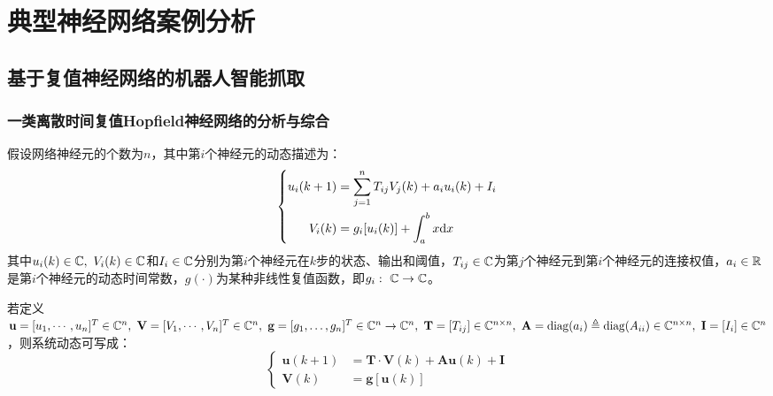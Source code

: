 ﻿%

\chapter{典型神经网络案例分析}

\section{基于复值神经网络的机器人智能抓取}

\subsection{一类离散时间复值Hopf\/ield神经网络的分析与综合}

假设网络神经元的个数为$n$，其中第$i$个神经元的动态描述为：
\begin{equation}
\left\{
\begin{aligned}
	u_i(k+1)&=\sum\limits_{j=1}^nT_{ij}V_{j}(k)+a_iu_i(k)+I_i\\
	V_i(k)&=g_i[u_i(k)]+\displaystyle\int_a^b x\text{d} x
\end{aligned}
\right.
\end{equation}
其中$u_i(k)\in \mathbb{C},\ V_i(k)\in \mcc$和$I_i\in\mathbb{C}$分别为第$i$个神经元在$k$步的状态、输出和阈值，$T_{ij}\in\mathbb{C}$为第$j$个神经元到第$i$个神经元的连接权值，$a_i\in\mathbb{R}$是第$i$个神经元的动态时间常数，$g(\cdot)$为某种非线性复值函数，即$g_i:\ \mathbb{C}\rightarrow\mathbb{C}$。

若定义$\mathbf{u}=[u_1,\cdots,u_n]^T\in\mcc^n,\ \mathbf{ V}=[V_1,\cdots,V_n]^T\in\mcc^n,\ \mathbf{g}=[g_1,\ldots,g_n]^T\in\mcc^n\rightarrow\mcc^n,\ \mathbf{ T}
=[T_{ij}]\in\mcc^{n\times n},\ \mathbf{A}=\diag(a_i)\triangleq \diag(A_{ii})
\in\mcc^{n\times n},\ \mathbf{ I}=[I_{i}]\in\mcc^{n}$，则系统动态可写成：
\begin{equation}
\left\{
\begin{aligned}
	\mathbf{u}(k+1)&=\mathbf{T}\cdot\mathbf{V}(k)+\mathbf{A}\mathbf{u}(k)+\mathbf{ I}\\
	\mathbf{V}(k)&=\mathbf{g}[\mathbf{u}(k)]
\end{aligned}
\right.
\end{equation}

